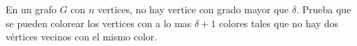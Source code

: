 \begin{problem}
    En un grafo $G$ con $n$ vertices, no hay vertice con grado mayor que $\delta$. Prueba que se pueden colorear los 
    vertices con a lo mas $\delta+1$ colores tales que no hay dos v\'ertices vecinos con el mismo color.
    \label{24EN481}
\end{problem}
